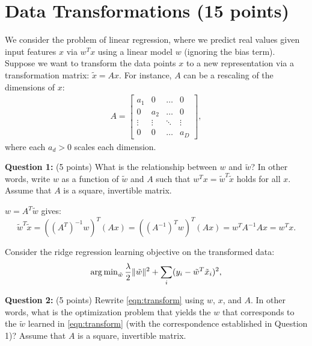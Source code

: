 \newcommand{\wt}{\tilde{w}}
\newcommand{\xt}{\tilde{x}}

\section{Data Transformations (15 points)}

We consider the problem of linear regression, where we predict real values given input features $x$ via $w^T x$ using a linear model $w$ (ignoring the bias term).
Suppose we want to transform the data points $x$ to a new representation via a transformation matrix: $\xt = Ax$.  For instance, $A$ can be a rescaling of the dimensions of $x$:
\begin{eqnarray}
A = \left[\begin{array}{cccc}
a_1& 0 & \ldots& 0\\
0& a_2 & \ldots& 0\\
\vdots & \vdots & \ddots & \vdots\\
0 & 0 & \ldots & a_D
\end{array}\right],
\label{eqn:A}
\end{eqnarray}
where each $a_d>0$ scales each dimension.

\textbf{Question 1:} (5 points) What is the relationship between $w$ and $\wt$?  In other words, write $w$ as a function of $\wt$ and $A$ such that $w^T x = \wt^T \xt$ holds for all $x$.
Assume that $A$ is a square, invertible matrix.

\begin{solution}
$w = A^T \wt$ gives:
$$\wt^T\xt = \left((A^T)^{-1}w\right)^T\left(Ax\right) = \left((A^{-1})^T w\right)^T\left(Ax\right) = w^T A^{-1} A x = w^T x.$$
\end{solution}


\bigskip

Consider the ridge regression learning objective on the transformed data:
\begin{eqnarray}
\argmin_{\wt} \frac{\lambda}{2}\|\wt\|^2 + \sum_{i}(y_i - \wt^T\xt_i)^2,\label{eqn:transform}
   \end{eqnarray}


\smallskip

\textbf{Question 2:} (5 points) Rewrite \eqref{eqn:transform} using $w$, $x$, and $A$. In other words, what is the optimization problem that yields the $w$ that corresponds to the $\wt$ learned in \eqref{eqn:transform} (with the correspondence established in Question 1)?  Assume that $A$ is a square, invertible matrix.

